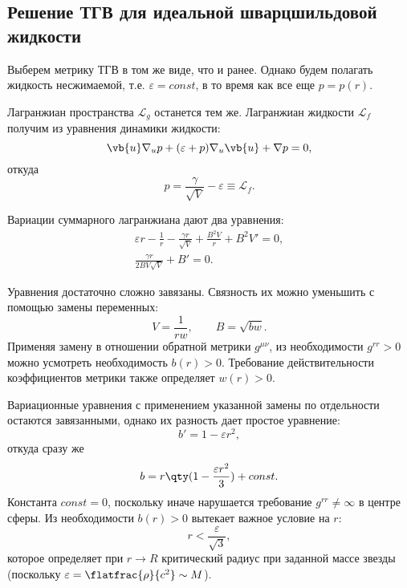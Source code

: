 \documentclass[\docroot/reports/draft/report.tex]{subfiles}
\begin{document}
\subsection{Решение ТГВ для идеальной шварцшильдовой жидкости}

    Выберем метрику ТГВ в том же виде, что и ранее. Однако будем полагать жидкость несжимаемой, т.е. $\varepsilon = const$, в то время как все еще $p = p(r)$.

    Лагранжиан пространства $\mathcal{L}_g$ останется тем же. Лагранжиан жидкости $\mathcal{L}_f$ получим из уравнения динамики жидкости:
    \begin{equation*}
        \vb{u} \nabla_u p + (\varepsilon + p) \nabla_u \vb{u} + \nabla p = 0 ,
    \end{equation*}
    откуда
    \begin{equation*}
        p = \frac{\gamma}{\sqrt{V}} - \varepsilon \equiv \mathcal{L}_f .
    \end{equation*}

    Вариации суммарного лагранжиана дают два уравнения:
    \begin{gather*}
        \varepsilon r - \frac{1}{r} - \frac{\gamma r}{\sqrt{V}} + \frac{B^2 V}{r} + B^2 V' = 0 , \\
        \frac{\gamma r}{2 B V \sqrt{V}} + B' = 0 .
    \end{gather*}

    Уравнения достаточно сложно завязаны. Связность их можно уменьшить с помощью замены переменных:
    \begin{equation*}
        V = \frac{1}{r w} , \qquad B = \sqrt{b w} .
    \end{equation*}
    Применяя замену в отношении обратной метрики $g^{\mu\nu}$, из необходимости $g^{rr} > 0$ можно усмотреть необходимость $b(r) > 0$. Требование действительности коэффициентов метрики также определяет $w(r) > 0$.

    Вариационные уравнения с применением указанной замены по отдельности остаются завязанными, однако их разность дает простое уравнение:
    \begin{equation*}
        b' = 1 - \varepsilon r^2 ,
    \end{equation*}
    откуда сразу же
    \begin{equation*}
        b = r \qty(1 - \frac{\varepsilon r^2}{3}) + const .
    \end{equation*}
    Константа $const = 0$, поскольку иначе нарушается требование $g^{rr} \neq \infty$ в центре сферы. Из необходимости $b(r) > 0$ вытекает важное условие на $r$:
    \begin{equation*}
        r < \frac{\varepsilon}{\sqrt{3}} ,
    \end{equation*}
    которое определяет при $r \to R$ критический радиус при заданной массе звезды (поскольку $\varepsilon = \flatfrac{\rho}{c^2} \sim M$).
\end{document}
